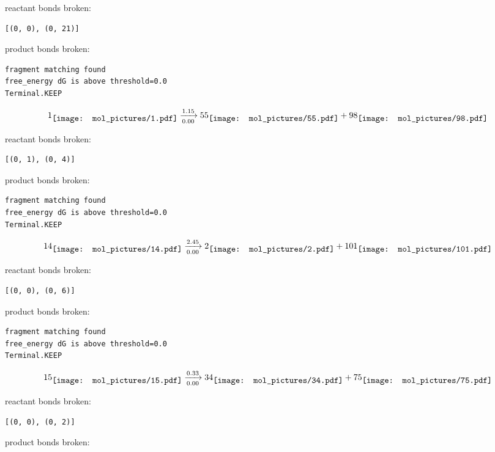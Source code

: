 \documentclass{article}
\begin{document}
reactant bonds broken:\begin{verbatim}
[(0, 0), (0, 21)]
\end{verbatim}
product bonds broken:



\vspace{1cm}
\begin{verbatim}
fragment matching found
free_energy dG is above threshold=0.0
Terminal.KEEP
\end{verbatim}
$$
1
\raisebox{-.5\height}{\texttt{[image: mol\_pictures/1.pdf]}}
\xrightarrow[0.00]{1.15}
55
\raisebox{-.5\height}{\texttt{[image: mol\_pictures/55.pdf]}}
+
98
\raisebox{-.5\height}{\texttt{[image: mol\_pictures/98.pdf]}}
$$


reactant bonds broken:\begin{verbatim}
[(0, 1), (0, 4)]
\end{verbatim}
product bonds broken:



\vspace{1cm}
\begin{verbatim}
fragment matching found
free_energy dG is above threshold=0.0
Terminal.KEEP
\end{verbatim}
$$
14
\raisebox{-.5\height}{\texttt{[image: mol\_pictures/14.pdf]}}
\xrightarrow[0.00]{2.45}
2
\raisebox{-.5\height}{\texttt{[image: mol\_pictures/2.pdf]}}
+
101
\raisebox{-.5\height}{\texttt{[image: mol\_pictures/101.pdf]}}
$$


reactant bonds broken:\begin{verbatim}
[(0, 0), (0, 6)]
\end{verbatim}
product bonds broken:



\vspace{1cm}
\begin{verbatim}
fragment matching found
free_energy dG is above threshold=0.0
Terminal.KEEP
\end{verbatim}
$$
15
\raisebox{-.5\height}{\texttt{[image: mol\_pictures/15.pdf]}}
\xrightarrow[0.00]{0.33}
34
\raisebox{-.5\height}{\texttt{[image: mol\_pictures/34.pdf]}}
+
75
\raisebox{-.5\height}{\texttt{[image: mol\_pictures/75.pdf]}}
$$


reactant bonds broken:\begin{verbatim}
[(0, 0), (0, 2)]
\end{verbatim}
product bonds broken:
\end{document}
